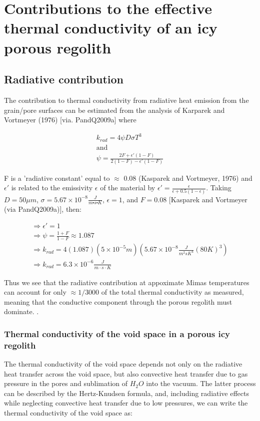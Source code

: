 \documentclass[11pt]{article} %
\begin{document}
\section{Contributions to the effective thermal conductivity of an icy porous regolith}
\subsection{Radiative contribution}
The contribution to thermal conductivity from radiative heat emission from the grain/pore surfaces can be estimated from the analysis of Karparek and Vortmeyer (1976) [via. PandQ2009a] where

	\begin{equation}
	\begin{split}
	k_{rad} = 4 \psi D \sigma T^{3} \\
	\text{and} \\
	\psi = \frac{2F + \epsilon'(1-F)}{2(1-F)-\epsilon'(1-F)}
	\end{split}
	\end{equation}

	F is a 'radiative constant' equal to $\approx$ 0.08 (Kasparek and Vortmeyer, 1976) and $\epsilon'$ is related to the emissivity $\epsilon$ of the material by $\epsilon' = \frac{\epsilon}{\epsilon +0.5(1-\epsilon)}$. Taking $D = 50 \mu m$, $\sigma = 5.67 \times 10^{-8} \frac{J}{m \centerdot s \centerdot K}$, $\epsilon = 1$, and $F = 0.08$ [Kasparek and Vortmeyer (via PandQ2009a)], then:
	
	\begin{equation}
	\begin{split}
	\Rightarrow \epsilon' = 1 \\
	\Rightarrow \psi = \frac{1+F}{1-F} \approx 1.087 \\
	\Rightarrow k_{rad} = 4 (1.087)(5\times10^{-5} m)(5.67\times10^{-8} \frac{J}{m^{2} s K^{4}}(80 K)^{3}) \\
	\Rightarrow k_{rad} = 6.3\times10^{-6} \frac{J}{m \cdot s \cdot K}
	\end{split}
	\end{equation}

Thus we see that the radiative contribution at appoximate Mimas temperatures can account for only $\approx 1/3000$ of the total thermal conductivity as measured, meaning that the conductive component through the porous regolith must dominate. . 

\subsubsection{Thermal conductivity of the void space in a porous icy regolith}
	The thermal conductivity of the void space depends not only on the radiative heat transfer across the void space, but also convective heat transfer due to gas pressure in the pores and sublimation of $H_{2}O$ into the vacuum. The latter process can be described by the Hertz-Knudsen formula, and, including radiative effects while neglecting convective heat transfer due to low pressures, we can write the thermal conductivity of the void space as:
\end{document}
